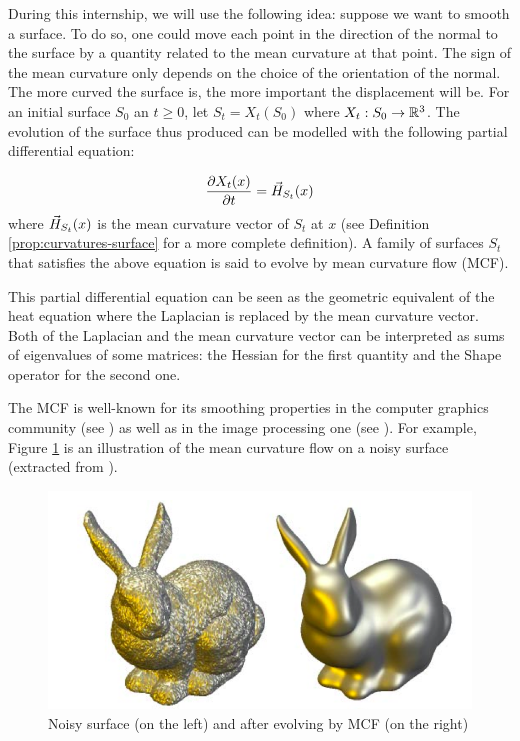 During this internship, we will use the following idea: suppose we want to
smooth a surface. To do so, one could move each point in the direction of the
normal to the surface by a quantity related to the mean curvature at that point.
The sign of the mean curvature only depends on the choice of the orientation of
the normal.  The more curved the surface is, the more important the displacement
will be. For an initial surface $ S_0 $ an $ t \geq 0 $, let $ S_t = X_t(S_0) $
where $ X_t : S_0 \to \mathbb{R}^3 $. The evolution of the surface thus produced can be
modelled with the following partial differential equation:

$$ \frac{\partial{X_t(x)}}{\partial{t}} = \vec{H}_{S_t}(x) $$
where $ \vec{H}_{S_t}(x) $ is the mean curvature vector of $ S_t $ at $ x $
(see Definition \ref{prop:curvatures-surface} for a more complete definition).
A family of surfaces $ S_t $ that satisfies the above equation is said to evolve
by mean curvature flow (MCF).

This partial differential equation can be seen as the geometric equivalent of
the heat equation where the Laplacian is replaced by the mean curvature
vector. Both of the Laplacian and the mean curvature vector can be interpreted
as sums of eigenvalues of some matrices: the Hessian for the first quantity and
the Shape operator for the second one.

The MCF is well-known for its smoothing properties in the computer graphics
community (see \cite{desbrun1999implicit}) as well as in the image processing
one (see \cite{ciomaga2010level}). For example, Figure
\ref{fig:mean-curvature-flow-ex} is an illustration of the mean curvature flow
on a noisy surface (extracted from \cite{clarenz2000anisotropic}).

\begin{figure}[h]
    \centering
    \includegraphics[scale=0.3]{img/mean-curvature-flow-rabbit}
    \caption{Noisy surface (on the left) and after evolving by MCF (on the
        right)}
    \label{fig:mean-curvature-flow-ex}
\end{figure}

